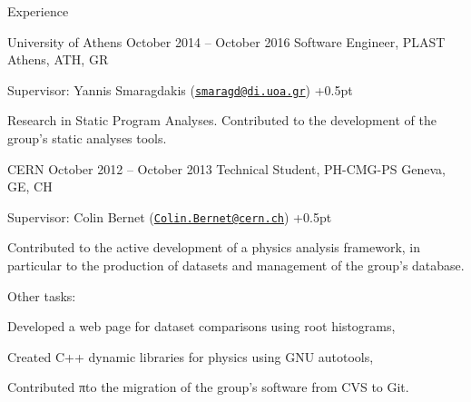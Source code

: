 \documentclass{resume}
\begin{document}
\begin{rSection}{Experience}

\begin{rSubsection}
  {University of Athens}
  {October 2014 -- October 2016}
  {Software Engineer, PLAST}
  {Athens, ATH, GR}
\item Supervisor: Yannis Smaragdakis
  (\href{mailto:smaragd@di.uoa.gr}{\nolinkurl{smaragd@di.uoa.gr}})
  \itemsep +0.5pt %
\item Research in Static Program Analyses. Contributed to the development of
  the group's static analyses tools.
\end{rSubsection}


\begin{rSubsection}
  {CERN}
  {October 2012 -- October 2013}
  {Technical Student, PH-CMG-PS}
  {Geneva, GE, CH}
\item Supervisor: Colin Bernet
  (\href{mailto:Colin.Bernet@cern.ch}{\nolinkurl{Colin.Bernet@cern.ch}})
  \itemsep +0.5pt %
\item Contributed to the active development of a physics analysis framework,
  in particular to the production of datasets and management of the
  group's database.
\item Other tasks: \\
  \begin{inparaenum}[(i)]
  \item Developed a web page for dataset comparisons using root histograms, \\
  \item Created C++ dynamic libraries for physics using GNU autotools, \\
  \item Contributed πto the migration of the group's software from CVS to Git.
  \end{inparaenum}
\end{rSubsection}




\end{rSection}
\end{document}
